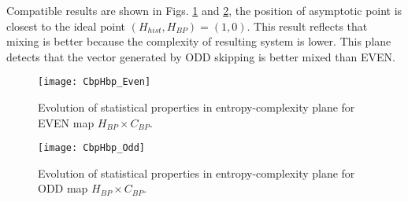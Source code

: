 Compatible results are shown in Figs. \ref{fig:EVEN_HC} and \ref{fig:ODD_HC}, the position of asymptotic point is closest to the ideal point $(H_{hist}, H_{BP})=(1, 0)$.
This result reflects that mixing is better because the complexity of resulting system is lower.
This plane detects that the vector generated by ODD skipping is better mixed than EVEN.
 
\begin{figure}[htpb]
	\centering
	\texttt{[image: CbpHbp\_Even]}
	\caption{Evolution of statistical properties in entropy-complexity plane for EVEN map $H_{BP} \times C_{BP}$.}
	\label{fig:EVEN_HC}
\end{figure}

\begin{figure}[htpb]
	\centering
	\texttt{[image: CbpHbp\_Odd]}
	\caption{Evolution of statistical properties in entropy-complexity plane for ODD map $H_{BP} \times C_{BP}$.}
	\label{fig:ODD_HC}
\end{figure}